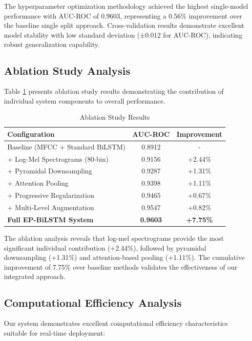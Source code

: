 \documentclass[conference]{IEEEtran}
\begin{document}
The hyperparameter optimization methodology achieved the highest single-model performance with AUC-ROC of 0.9603, representing a 0.56\% improvement over the baseline single split approach. Cross-validation results demonstrate excellent model stability with low standard deviation (±0.012 for AUC-ROC), indicating robust generalization capability.

\subsection{Ablation Study Analysis}

Table \ref{tab:ablation} presents ablation study results demonstrating the contribution of individual system components to overall performance.

\begin{table}[h]
\centering
\caption{Ablation Study Results}
\label{tab:ablation}
\begin{tabular}{l|c|c}
\hline
\textbf{Configuration} & \textbf{AUC-ROC} & \textbf{Improvement} \\
\hline
Baseline (MFCC + Standard BiLSTM) & 0.8912 & - \\
+ Log-Mel Spectrograms (80-bin) & 0.9156 & +2.44\% \\
+ Pyramidal Downsampling & 0.9287 & +1.31\% \\
+ Attention Pooling & 0.9398 & +1.11\% \\
+ Progressive Regularization & 0.9465 & +0.67\% \\
+ Multi-Level Augmentation & 0.9547 & +0.82\% \\
\hline
\textbf{Full EP-BiLSTM System} & \textbf{0.9603} & \textbf{+7.75\%} \\
\hline
\end{tabular}
\end{table}

The ablation analysis reveals that log-mel spectrograms provide the most significant individual contribution (+2.44\%), followed by pyramidal downsampling (+1.31\%) and attention-based pooling (+1.11\%). The cumulative improvement of 7.75\% over baseline methods validates the effectiveness of our integrated approach.

\subsection{Computational Efficiency Analysis}

Our system demonstrates excellent computational efficiency characteristics suitable for real-time deployment:
\end{document}
